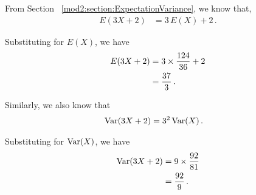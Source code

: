 \begin{subquestions}

\subquestion

From Section ~\ref{mod2:section:ExpectationVariance}, we know that,
\begin{align}
	E(3X+2) & = 3\, E(X) +2\,.
\end{align}

Substituting for $E(X)$, we have
\begin{align}
	E(3X+2)  & = 3 \times \frac{124}{36} + 2 \nonumber \\
	         & = \frac{37}{3} \,. 
\end{align}

Similarly, we also know that
\begin{align}
	\text{Var}(3X+2) & = 3^2 \, \text{Var}(X) \,.
\end{align}

Substituting for $\text{Var}(X)$, we have
\begin{align}
	\text{Var}(3X+2) & = 9  \times \frac{92}{81} \nonumber \\
	           & = \frac{92}{9} \,.
\end{align}

\end{subquestions}
